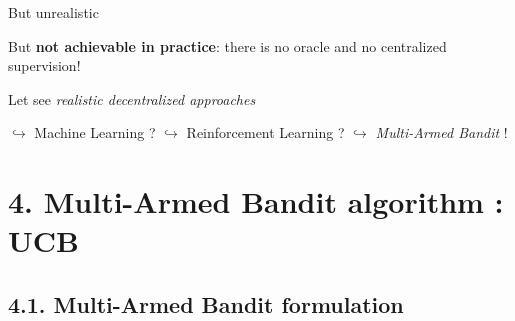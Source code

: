 \begin{frameO}

    \begin{colorblock}{But unrealistic}

        But \textbf{not achievable in practice}: there is no oracle and no centralized supervision!

    \end{colorblock}

    \begin{colorblock}{Let see \emph{realistic decentralized approaches}}

        \(\hookrightarrow\) Machine Learning ? \newline
        \hspace*{15pt}\(\hookrightarrow\) Reinforcement Learning ? \newline
        \hspace*{30pt} \(\hookrightarrow\) \emph{Multi-Armed Bandit} !

    \end{colorblock}

\end{frameO}



\section{\hfill{}4. Multi-Armed Bandit algorithm : UCB\hfill{}}

\subsection{\hfill{}4.1. Multi-Armed Bandit formulation\hfill{}}

